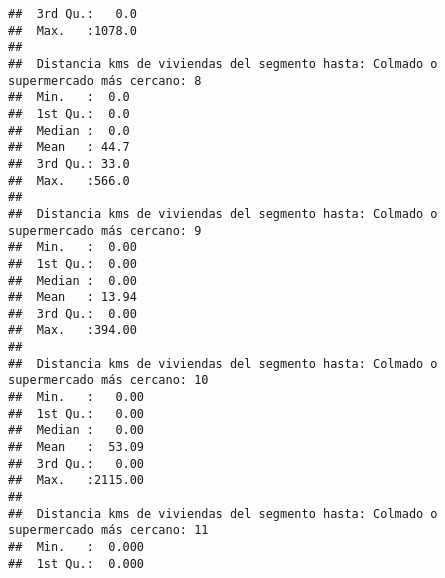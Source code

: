 \documentclass[11pt,]{article}
\begin{document}
\begin{verbatim}
##  3rd Qu.:   0.0                                                                      
##  Max.   :1078.0                                                                      
##                                                                                      
##  Distancia kms de viviendas del segmento hasta: Colmado o supermercado más cercano: 8
##  Min.   :  0.0                                                                       
##  1st Qu.:  0.0                                                                       
##  Median :  0.0                                                                       
##  Mean   : 44.7                                                                       
##  3rd Qu.: 33.0                                                                       
##  Max.   :566.0                                                                       
##                                                                                      
##  Distancia kms de viviendas del segmento hasta: Colmado o supermercado más cercano: 9
##  Min.   :  0.00                                                                      
##  1st Qu.:  0.00                                                                      
##  Median :  0.00                                                                      
##  Mean   : 13.94                                                                      
##  3rd Qu.:  0.00                                                                      
##  Max.   :394.00                                                                      
##                                                                                      
##  Distancia kms de viviendas del segmento hasta: Colmado o supermercado más cercano: 10
##  Min.   :   0.00                                                                      
##  1st Qu.:   0.00                                                                      
##  Median :   0.00                                                                      
##  Mean   :  53.09                                                                      
##  3rd Qu.:   0.00                                                                      
##  Max.   :2115.00                                                                      
##                                                                                       
##  Distancia kms de viviendas del segmento hasta: Colmado o supermercado más cercano: 11
##  Min.   :  0.000                                                                      
##  1st Qu.:  0.000                                                                      

\end{verbatim}
\end{document}
